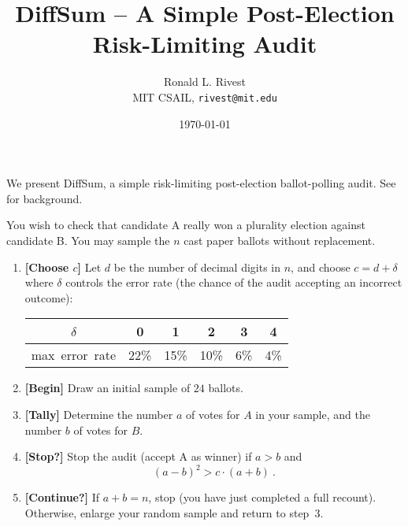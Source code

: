 \documentclass[twocolumn]{article}
\begin{document}


\title{{\sc DiffSum} -- A Simple Post-Election Risk-Limiting Audit}
\author{Ronald L. Rivest\\
  MIT CSAIL, {\texttt{rivest@mit.edu}}}
\date{\today}
\maketitle

\thispagestyle{empty}


We present {\sc DiffSum}, a simple risk-limiting post-election ballot-polling audit.
See~\cite{NBHC07,LindemanStYa12,LindemanSt12}
for background.

You wish to check that candidate A really won a plurality election against candidate B.
You may sample the $n$ cast paper ballots without replacement.

\begin{leftbar}
\begin{enumerate}

\item {\bf [Choose $c$]} Let $d$ be the number of decimal digits in $n$, and
  choose $c = d+\delta$ where $\delta$ controls the error rate (the chance of the audit accepting
  an incorrect outcome):
\begin{tabular} {c|c|c|c|c|c}
      $\delta$          &  0   &  1   &  2   &  3   & 4 \\ \hline
      \hbox{max error rate} & 22\% & 15\% & 10\% &  6\% & 4\% 
    \end{tabular}


  \item {\bf [Begin]} Draw an initial sample of $24$ ballots.

  \item {\bf [Tally]} Determine the number $a$ of votes for $A$ in your sample, and the number $b$ of
    votes for $B$.

  \item {\bf [Stop?]} Stop the audit (accept A as winner) if $a>b$ and 
    \begin{equation}
         (a-b)^2 > c \cdot (a+b)\ .
    \label{eq:diffsum1}
    \end{equation}

  \item {\bf [Continue?]} 
    If $a+b=n$, stop (you have just completed a full recount).
    Otherwise, enlarge your random sample and return to step~3.
\end{enumerate}
\vspace{-0.15in}
\end{leftbar}
\end{document}

